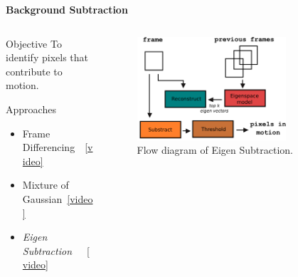 \begin{frame}{\textbf{Background Subtraction}}

\begin{columns}
	\begin{column}{0.48\textwidth}
		\begin{varblock}[\textwidth]{Objective}
			To identify pixels that contribute to motion.
		\end{varblock}
		\begin{varblock}[\textwidth]{Approaches\cite{piccardi}}
			\begin{itemize}							
				\item Frame Differencing~~\href{run:videos/bgsub/fd.avi}{{\color{red}[video]}}
				\item Mixture of Gaussian~\href{run:videos/bgsub/mog.avi}{{\color{red}[video]}}
				\item \textit{\color{blue}Eigen Subtraction}~~~\href{run:videos/bgsub/es.avi}{{\color{red}[video]}}		
			\end{itemize}
		\end{varblock}
	\end{column}
	\begin{column}{0.49\textwidth}
		\begin{figure}
			\begin{framed}
			\centering
				\includegraphics[width=0.75\textwidth]{./img/eigensub.png}
			\end{framed}
			\caption{Flow diagram of Eigen Subtraction.}
		\end{figure}
	\end{column}
\end{columns}
\end{frame}